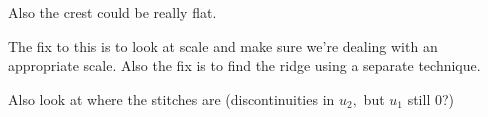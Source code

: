 Also the crest could be really flat.

The fix to this is to look at scale and make sure we're dealing with an appropriate scale. Also the fix is to find the ridge using a separate technique.

Also look at where the stitches are (discontinuities in $u_2,$ but $u_1$ still 0?)

